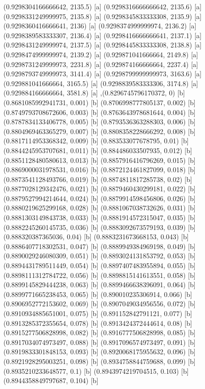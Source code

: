 {{{(0.9298304166666642, 2135.5) [a] 
(0.9298316666666642, 2135.6) [a] 
(0.9298331249999975, 2135.8) [a] 
(0.9298345833333308, 2135.9) [a] 
(0.9298360416666641, 2136) [a] 
(0.9298374999999974, 2136.2) [a] 
(0.9298389583333307, 2136.4) [a] 
(0.9298416666666641, 2137.1) [a] 
(0.9298431249999974, 2137.5) [a] 
(0.9298445833333308, 2138.8) [a] 
(0.9298474999999974, 2139.2) [a] 
(0.929871041666664, 2149.8) [a] 
(0.9298731249999973, 2231.8) [a] 
(0.929874166666664, 2237.4) [a] 
(0.9298793749999973, 3141.4) [a] 
(0.9298799999999973, 3163.6) [a] 
(0.929881041666664, 3165.5) [a] 
(0.9298839583333306, 3174.8) [a] 
(0.929884166666664, 3581.8) [a] 
},{(0.8296745796170372, 0) [b] 
(0.8681085992941731, 0.001) [b] 
(0.8706998777805137, 0.002) [b] 
(0.8749793708672606, 0.003) [b] 
(0.8763643978681644, 0.004) [b] 
(0.8787834133406778, 0.005) [b] 
(0.8793536363288303, 0.006) [b] 
(0.8804969463365279, 0.007) [b] 
(0.8808358228666292, 0.008) [b] 
(0.8817114953368342, 0.009) [b] 
(0.883533077678795, 0.01) [b] 
(0.8844245953707681, 0.011) [b] 
(0.884486033507935, 0.012) [b] 
(0.8851128480580613, 0.013) [b] 
(0.8857916416796269, 0.015) [b] 
(0.8869000031978531, 0.016) [b] 
(0.8872124461827099, 0.018) [b] 
(0.8873541128493766, 0.019) [b] 
(0.8874811817285738, 0.02) [b] 
(0.8877028129342476, 0.021) [b] 
(0.8879460430299181, 0.022) [b] 
(0.8879527994214644, 0.024) [b] 
(0.8879914598456806, 0.026) [b] 
(0.8880219625299168, 0.028) [b] 
(0.8881067038732626, 0.031) [b] 
(0.8881303149843738, 0.033) [b] 
(0.8881914572315047, 0.035) [b] 
(0.8882245260145735, 0.036) [b] 
(0.8883092673579193, 0.039) [b] 
(0.888320387365036, 0.04) [b] 
(0.8883231673668153, 0.043) [b] 
(0.8886407718302531, 0.047) [b] 
(0.8889949384969198, 0.049) [b] 
(0.8890029246080309, 0.051) [b] 
(0.8893024131853792, 0.053) [b] 
(0.8894431789511449, 0.054) [b] 
(0.8897407483955894, 0.055) [b] 
(0.8898111312784722, 0.056) [b] 
(0.8898815141613551, 0.058) [b] 
(0.8899145829444238, 0.063) [b] 
(0.8899466638396091, 0.064) [b] 
(0.8899771665238453, 0.065) [b] 
(0.890010235306914, 0.066) [b] 
(0.8906952772153602, 0.069) [b] 
(0.8907049034956556, 0.072) [b] 
(0.8910934885651001, 0.075) [b] 
(0.891152842791121, 0.077) [b] 
(0.8913285372355654, 0.078) [b] 
(0.8913424372444614, 0.08) [b] 
(0.8915277506828998, 0.082) [b] 
(0.8916777506828998, 0.085) [b] 
(0.8917034074973497, 0.088) [b] 
(0.8917096574973497, 0.091) [b] 
(0.8919833301848153, 0.093) [b] 
(0.8920068175955632, 0.096) [b] 
(0.8921928295003251, 0.098) [b] 
(0.8934758844759688, 0.099) [b] 
(0.8935210233648577, 0.1) [b] 
(0.8943974219704515, 0.103) [b] 
(0.8944358849797687, 0.104) [b] 
}}}

